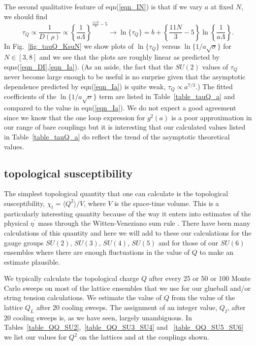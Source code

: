 \documentclass[12pt]{article}
\begin{document}
The second qualitative feature of eqn(\ref{eqn_IN}) is that if we vary $a$ at
fixed $N$, we should find 
%
\begin{equation}
  \tau_Q \propto \frac{1}{D(\rho)} \propto \left\{\frac{1}{a\Lambda}\right\}^{\frac{11N}{3}-5}
\longrightarrow
  \ln\{\tau_Q\} = b + \left\{\frac{11N}{3}-5\right\} \ln \left\{\frac{1}{a\Lambda}\right\}.
\label{eqn_Ia}
\end{equation}
In  Fig.~\ref{fig_tauQ_KsuN} we show plots of $\ln\{\tau_Q\}$ versus  $\ln\{1/a\surd\sigma\}$
for $N\in[3,8]$ and we see that the plots are roughly linear as predicted by
eqns(\ref{eqn_DI},\ref{eqn_Ia}). (As an aside, the fact that the $SU(2)$ values of $\tau_Q$ never
become large enough to be useful is no surprise given that the asymptotic dependence predicted
by eqn(\ref{eqn_Ia}) is quite weak, $\tau_Q\propto a^{7/3}$.)
The fitted coefficients of the $\ln\{1/a\surd\sigma\}$
term are listed in Table~\ref{table_tauQ_a} and compared to the value in eqn(\ref{eqn_Ia}).
We do not expect a good agreement since we know that the one loop expression for $g^2(a)$ is a poor
approximation in our range of bare couplings but it is interesting that our calculated values
listed in Table~\ref{table_tauQ_a}  do reflect the trend of the asymptotic theoretical values.


%
%
\subsection{topological susceptibility}
\label{subsection_Qsusc}

The simplest topological quantity that one can calculate is the topological susceptibility,
$\chi_t = \langle Q^2 \rangle / V$, where $V$ is the space-time volume. This is a
particularly interesting quantity because of the way it enters into estimates of the physical
$\eta^{\prime}$ mass through the Witten-Veneziano sum rule
%
\cite{Veneziano_eta,Witten_eta}.
%
There have been many calculations of this quantity and here we will add to these our calculations
for the gauge groups $SU(2)$, $SU(3)$, $SU(4)$, $SU(5)$ and for those of our $SU(6)$
ensembles where there are enough fluctuations in the value of $Q$ to make an estimate plausible.

We typically calculate the topological charge $Q$ after every 25 or 50 or 100 Monte Carlo
sweeps on most of the lattice ensembles that we use for our glueball and/or string
tension calculations. We estimate the value of $Q$ from the value of the lattice $Q_L$ after 20
cooling sweeps. The assignment of an integer value, $Q_I$, after 20 cooling sweeps is, as we
have seen, largely unambiguous. In Tables~\ref{table_QQ_SU2},~\ref{table_QQ_SU3_SU4} and
~\ref{table_QQ_SU5_SU6} we list our values for $Q^2$ on the lattices and at the couplings shown.
\end{document}

